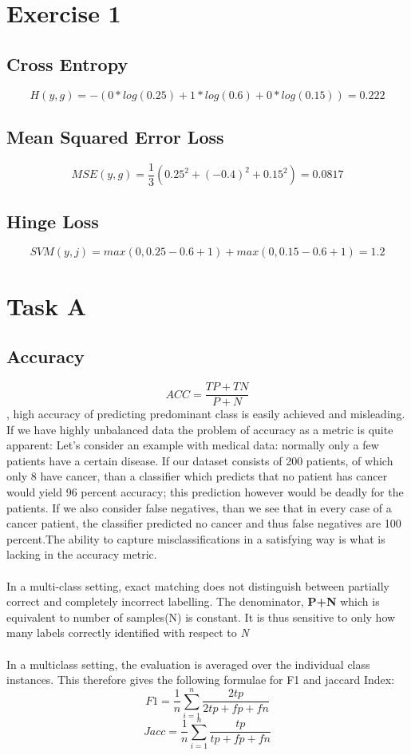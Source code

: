 \documentclass[10pt]{article}
\begin{document}
\section{Exercise 1}
\subsection{Cross Entropy}
$$H(y,g)= -(0*log(0.25)+1*log(0.6)+0*log(0.15))=0.222$$
\subsection{Mean Squared Error Loss}
$$MSE(y,g)= \frac{1}{3}(0.25^2+(-0.4)^2+0.15^2)=0.0817$$
\subsection{Hinge Loss}
$$SVM(y,j)=max(0,0.25-0.6+1)+max(0,0.15-0.6+1)= 1.2$$

\section{Task A}
\subsection{Accuracy}
$$ACC = \frac{TP+TN}{P+N}$$, high accuracy of predicting predominant class is easily achieved and misleading.
If we have highly unbalanced data the problem of accuracy as a metric is quite apparent:
Let's consider an example with medical data: normally only a few patients have a certain disease.
If our dataset consists of 200 patients, of which only 8 have cancer, than a classifier which predicts
that no patient has cancer would yield 96 percent accuracy;
this prediction however would be deadly for the patients.
If we also consider false negatives, than we see that in every case of a cancer patient,
the classifier predicted no cancer and thus false negatives are 100 percent.The ability to  capture misclassifications in a satisfying way is what is lacking in the accuracy metric.
\paragraph{}
In a multi-class setting, exact matching does not distinguish between partially correct and completely incorrect labelling.
The denominator, \textbf{P+N} which is equivalent to number of samples(N) is constant. It is thus sensitive to only how many labels correctly identified with respect to \textit{N}
\paragraph{}
In a multiclass setting, the evaluation is averaged over the individual class instances.
This therefore gives the following formulae for F1 and jaccard Index:
$$F1 =\frac{1}{n}\sum_{i=1}^{n} \frac{2tp}{2tp+fp+fn}$$
$$Jacc =\frac{1}{n}\sum_{i=1}^{n} \frac{tp}{tp+fp+fn}$$
\end{document}
